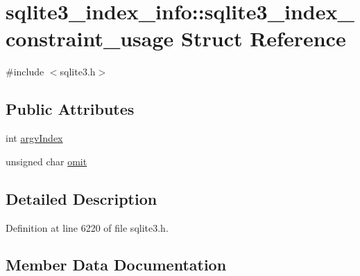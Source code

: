 \hypertarget{structsqlite3__index__info_1_1sqlite3__index__constraint__usage}{}\section{sqlite3\+\_\+index\+\_\+info\+:\+:sqlite3\+\_\+index\+\_\+constraint\+\_\+usage Struct Reference}
\label{structsqlite3__index__info_1_1sqlite3__index__constraint__usage}


{\ttfamily \#include $<$sqlite3.\+h$>$}

\subsection*{Public Attributes}
\begin{DoxyCompactItemize}
\item 
int \mbox{\hyperlink{structsqlite3__index__info_1_1sqlite3__index__constraint__usage_a2cbf680033c2937b3de226e091743a94}{argv\+Index}}
\item 
unsigned char \mbox{\hyperlink{structsqlite3__index__info_1_1sqlite3__index__constraint__usage_ad07fa17d30e4fb3abe23ceaf84edf0ef}{omit}}
\end{DoxyCompactItemize}


\subsection{Detailed Description}


Definition at line 6220 of file sqlite3.\+h.



\subsection{Member Data Documentation}
\mbox{\label{structsqlite3__index__info_1_1sqlite3__index__constraint__usage_a2cbf680033c2937b3de226e091743a94}} 
